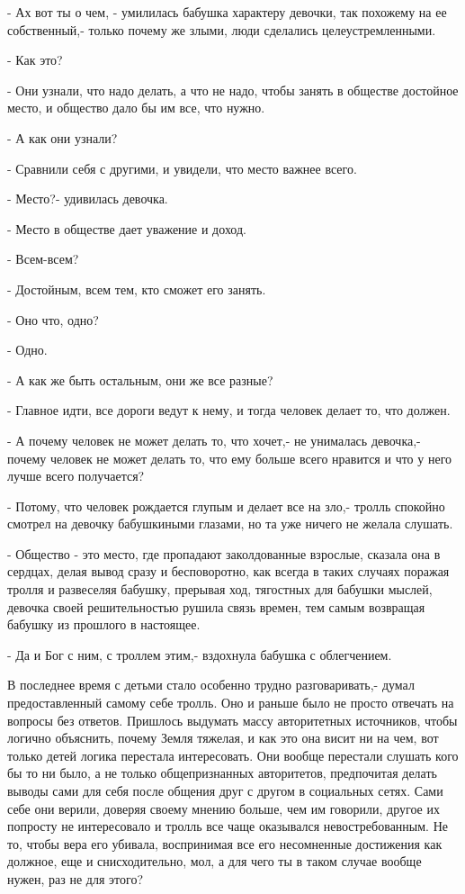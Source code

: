 -  Ах вот ты о чем, - умилилась бабушка характеру девочки, так похожему на ее
собственный,- только почему же злыми, люди сделались целеустремленными.

- Как это?

- Они узнали, что надо делать, а что не надо, чтобы занять в обществе достойное
место, и общество дало бы им все, что нужно.

- А как они узнали?

- Сравнили себя с другими, и увидели, что место важнее всего.

- Место?- удивилась девочка.

- Место в обществе дает уважение и доход.

- Всем-всем?

- Достойным, всем тем, кто сможет его занять.

- Оно что, одно?

- Одно.

- А как же быть остальным, они же все разные?

- Главное идти, все дороги ведут к нему, и тогда человек делает то, что должен.

- А почему человек не может делать то, что хочет,- не унималась девочка,-
почему человек не может делать то, что ему больше всего нравится и что у него
лучше всего получается?

- Потому, что человек рождается глупым и делает все на зло,- тролль спокойно
смотрел на девочку бабушкиными глазами, но та уже ничего не желала слушать.

- Общество - это место, где пропадают заколдованные взрослые, сказала она в
сердцах, делая вывод сразу и бесповоротно, как всегда в таких случаях поражая
тролля и развеселяя бабушку, прерывая ход, тягостных для бабушки мыслей,
девочка своей решительностью рушила связь времен, тем самым возвращая бабушку
из прошлого в настоящее.

- Да и Бог с ним, с троллем этим,- вздохнула бабушка с облегчением.

В последнее время с детьми стало особенно трудно разговаривать,- думал
предоставленный самому себе тролль. Оно и раньше было не просто отвечать на
вопросы без ответов. Пришлось выдумать массу авторитетных источников, чтобы
логично объяснить, почему Земля тяжелая, и как это она висит ни на чем, вот
только детей логика перестала интересовать. Они вообще перестали слушать
кого бы то ни было, а не только общепризнанных авторитетов, предпочитая
делать выводы сами для себя после общения друг с другом в социальных сетях.
Сами себе они верили, доверяя своему мнению больше, чем им говорили, другое
их попросту не интересовало и тролль все чаще оказывался невостребованным.
Не то, чтобы вера его убивала, воспринимая все его несомненные достижения
как должное, еще и снисходительно, мол, а для чего ты в таком случае вообще
нужен, раз не для этого? 

